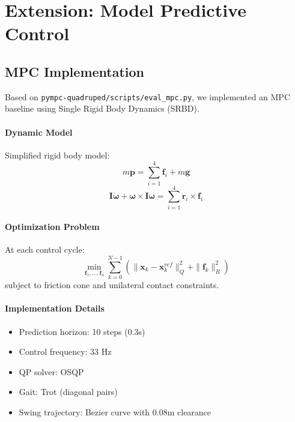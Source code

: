 \documentclass[12pt,a4paper]{article}
\begin{document}
\section{Extension: Model Predictive Control}

\subsection{MPC Implementation}

Based on \texttt{pympc-quadruped/scripts/eval\_mpc.py}, we implemented an MPC baseline using Single Rigid Body Dynamics (SRBD).

\paragraph{Dynamic Model}
Simplified rigid body model:
\begin{equation}
m\ddot{\mathbf{p}} = \sum_{i=1}^{4} \mathbf{f}_i + m\mathbf{g}
\end{equation}
\begin{equation}
\mathbf{I}\dot{\boldsymbol{\omega}} + \boldsymbol{\omega} \times \mathbf{I}\boldsymbol{\omega} = \sum_{i=1}^{4} \mathbf{r}_i \times \mathbf{f}_i
\end{equation}

\paragraph{Optimization Problem}
At each control cycle:
\begin{equation}
\min_{\mathbf{f}_1, \ldots, \mathbf{f}_4} \sum_{k=0}^{N-1} \left( \|\mathbf{x}_k - \mathbf{x}_k^{ref}\|_Q^2 + \|\mathbf{f}_k\|_R^2 \right)
\end{equation}
subject to friction cone and unilateral contact constraints.

\paragraph{Implementation Details}
\begin{itemize}
    \item Prediction horizon: 10 steps (0.3s)
    \item Control frequency: 33 Hz
    \item QP solver: OSQP
    \item Gait: Trot (diagonal pairs)
    \item Swing trajectory: Bezier curve with 0.08m clearance
\end{itemize}
\end{document}
